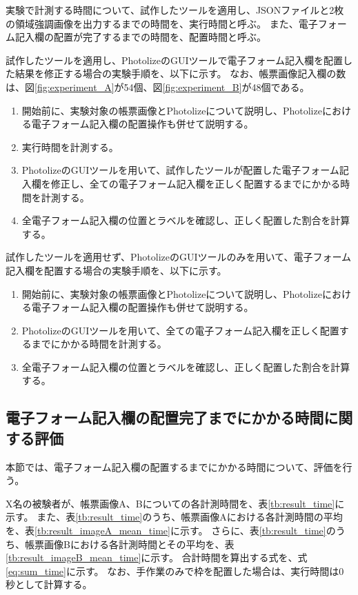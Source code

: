 実験で計測する時間について、試作したツールを適用し、JSONファイルと2枚の領域強調画像を出力するまでの時間を、実行時間と呼ぶ。
また、電子フォーム記入欄の配置が完了するまでの時間を、配置時間と呼ぶ。

試作したツールを適用し、PhotolizeのGUIツールで電子フォーム記入欄を配置した結果を修正する場合の実験手順を、以下に示す。
なお、帳票画像記入欄の数は、図\ref{fig:experiment_A}が54個、図\ref{fig:experiment_B}が48個である。

\begin{enumerate}
    \item 開始前に、実験対象の帳票画像とPhotolizeについて説明し、Photolizeにおける電子フォーム記入欄の配置操作も併せて説明する。
    \item 実行時間を計測する。
    \item PhotolizeのGUIツールを用いて、試作したツールが配置した電子フォーム記入欄を修正し、全ての電子フォーム記入欄を正しく配置するまでにかかる時間を計測する。
    \item 全電子フォーム記入欄の位置とラベルを確認し、正しく配置した割合を計算する。
\end{enumerate}

試作したツールを適用せず、PhotolizeのGUIツールのみを用いて、電子フォーム記入欄を配置する場合の実験手順を、以下に示す。

\begin{enumerate}
    \item 開始前に、実験対象の帳票画像とPhotolizeについて説明し、Photolizeにおける電子フォーム記入欄の配置操作も併せて説明する。
    \item PhotolizeのGUIツールを用いて、全ての電子フォーム記入欄を正しく配置するまでにかかる時間を計測する。
    \item 全電子フォーム記入欄の位置とラベルを確認し、正しく配置した割合を計算する。
\end{enumerate}

\subsection{電子フォーム記入欄の配置完了までにかかる時間に関する評価}\label{subsec:evalue_required_time}
本節では、電子フォーム記入欄の配置するまでにかかる時間について、評価を行う。

X名の被験者が、帳票画像A、Bについての各計測時間を、表\ref{tb:result_time}に示す。
また、表\ref{tb:result_time}のうち、帳票画像Aにおける各計測時間の平均を、表\ref{tb:result_imageA_mean_time}に示す。
さらに、表\ref{tb:result_time}のうち、帳票画像Bにおける各計測時間とその平均を、表\ref{tb:result_imageB_mean_time}に示す。
合計時間を算出する式を、式\ref{eq:sum_time}に示す。
なお、手作業のみで枠を配置した場合は、実行時間は0秒として計算する。

